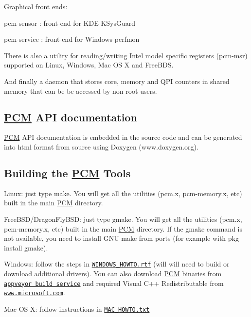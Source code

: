 Graphical front ends\+:
\begin{DoxyItemize}
\item pcm-\/sensor \+: front-\/end for K\+DE K\+Sys\+Guard
\item pcm-\/service \+: front-\/end for Windows perfmon
\end{DoxyItemize}

There is also a utility for reading/writing Intel model specific registers (pcm-\/msr) supported on Linux, Windows, Mac OS X and Free\+B\+DS.

And finally a daemon that stores core, memory and Q\+PI counters in shared memory that can be be accessed by non-\/root users. 

 \subsection*{\mbox{\hyperlink{class_p_c_m}{P\+CM}} A\+PI documentation }

\mbox{\hyperlink{class_p_c_m}{P\+CM}} A\+PI documentation is embedded in the source code and can be generated into html format from source using Doxygen (www.\+doxygen.\+org). 

 \subsection*{Building the \mbox{\hyperlink{class_p_c_m}{P\+CM}} Tools }


\begin{DoxyItemize}
\item Linux\+: just type \textquotesingle{}make\textquotesingle{}. You will get all the utilities (pcm.\+x, pcm-\/memory.\+x, etc) built in the main \mbox{\hyperlink{class_p_c_m}{P\+CM}} directory.
\item Free\+B\+S\+D/\+Dragon\+Fly\+B\+SD\+: just type \textquotesingle{}gmake\textquotesingle{}. You will get all the utilities (pcm.\+x, pcm-\/memory.\+x, etc) built in the main \mbox{\hyperlink{class_p_c_m}{P\+CM}} directory. If the \textquotesingle{}gmake\textquotesingle{} command is not available, you need to install G\+NU make from ports (for example with \textquotesingle{}pkg install gmake\textquotesingle{}).
\item Windows\+: follow the steps in \href{https://raw.githubusercontent.com/opcm/pcm/master/WINDOWS_HOWTO.rtf}{\tt W\+I\+N\+D\+O\+W\+S\+\_\+\+H\+O\+W\+T\+O.\+rtf} (will will need to build or download additional drivers). You can also download \mbox{\hyperlink{class_p_c_m}{P\+CM}} binaries from \href{https://ci.appveyor.com/project/opcm/pcm/build/artifacts}{\tt appveyor build service} and required Visual C++ Redistributable from \href{https://www.microsoft.com/en-us/download/details.aspx?id=48145}{\tt www.\+microsoft.\+com}.
\item Mac OS X\+: follow instructions in \href{https://github.com/opcm/pcm/blob/master/MAC_HOWTO.txt}{\tt M\+A\+C\+\_\+\+H\+O\+W\+T\+O.\+txt} 
\end{DoxyItemize}